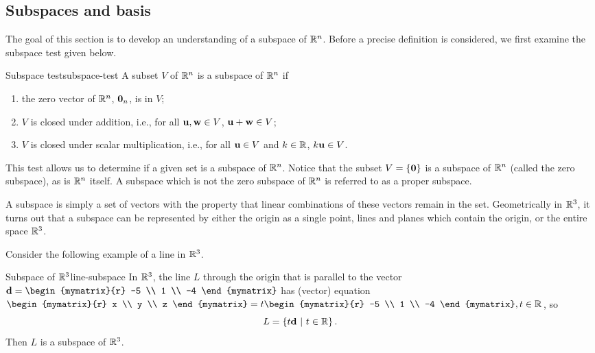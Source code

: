 \subsection{Subspaces and basis}

The goal of this section is to develop an understanding of a subspace of $\mathbb{R}^n$. Before a precise definition is considered, we first examine the subspace test given below.

\begin{theorem}{Subspace test}{subspace-test}
A subset $V$ of $\mathbb{R}^n$ is a subspace of $\mathbb{R}^n$ if 
\begin{enumerate}
\item the zero vector of $\mathbb{R}^n$, $\mbox{\bf 0}_n$, is in $V$;
\item $V$ is closed under addition, i.e., for all $\mbox{\bf u},\mbox{\bf w}\in V$, $\mbox{\bf u}+\mbox{\bf w}\in V$;
\item $V$ is closed under scalar multiplication, i.e., for all $\mbox{\bf u}\in V$
and $k\in\mathbb{R}$, $k\mbox{\bf u}\in V$.
\end{enumerate}
\end{theorem}

This test allows us to determine if a given set is a subspace of $\mathbb{R}^n$. Notice that the subset $V = \left\{\mbox{\bf 0} \right\}$ is a subspace of $\mathbb{R}^n$ (called the zero subspace), as is $\mathbb{R}^n$ itself. A subspace which is not the zero subspace of $\mathbb{R}^n$ is referred to as a proper subspace.

 A subspace is simply a set of vectors with the property that linear
combinations of these vectors remain in the set. Geometrically in
$\mathbb{R}^{3}$, it turns out that a subspace can be represented by
either the origin as a single point, lines and planes which contain
the origin, or the entire space $\mathbb{R}^{3}$. 

Consider the following example of a line in $\mathbb{R}^3$. 

\begin{example}{Subspace of $\mathbb{R}^3$}{line-subspace}
In $\mathbb{R}^3$, the line $L$ through the origin that is
parallel to the vector
${\vect{d}}= \begin{mymatrix}{r} -5 \\ 1 \\ -4 \end{mymatrix}$ 
has (vector) equation
$\begin{mymatrix}{r} x \\ y \\ z \end{mymatrix}
=t\begin{mymatrix}{r} -5 \\ 1 \\ -4 \end{mymatrix}, t\in\R$,
so 
\[ L=\left\{t{\mbox{\bf d}} ~|~ t\in\mathbb{R}\right\}.\] Then $L$ is a subspace of $\mathbb{R}^3$.  
\end{example}

